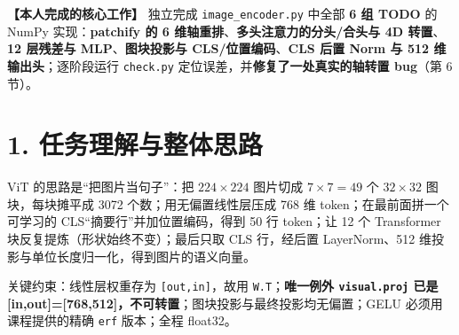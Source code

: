 \documentclass[11pt,a4paper]{article}
\newcommand{\hl}[1]{\textcolor{red!85!black}{\textbf{#1}}}
\newcommand{\code}[1]{\texttt{\small #1}}
\begin{document}
\vspace{2pt}
\noindent\colorbox{red!6}{\parbox{\dimexpr\linewidth-2\fboxsep\relax}{
\textcolor{red!85!black}{\textbf{【本人完成的核心工作】}} 独立完成 \code{image_encoder.py} 中全部 \hl{6 组 TODO} 的 NumPy 实现：\hl{patchify 的 6 维轴重排}、\hl{多头注意力的分头/合头与 4D 转置}、\hl{12 层残差与 MLP}、\hl{图块投影与 CLS/位置编码}、\hl{CLS 后置 Norm 与 512 维输出头}；逐阶段运行 \code{check.py} 定位误差，并\hl{修复了一处真实的轴转置 bug}（第 6 节）。}}

\section*{1. 任务理解与整体思路}
ViT 的思路是``把图片当句子''：把 $224\times224$ 图片切成 $7\times7=49$ 个 $32\times32$ 图块，每块摊平成 3072 个数；用无偏置线性层压成 768 维 token；在最前面拼一个可学习的 CLS``摘要行''并加位置编码，得到 50 行 token；让 12 个 Transformer 块反复提炼（形状始终不变）；最后只取 CLS 行，经后置 LayerNorm、512 维投影与单位长度归一化，得到图片的语义向量。

关键约束：线性层权重存为 \code{[out,in]}，故用 \code{W.T}；\hl{唯一例外 \code{visual.proj} 已是 [in,out]=[768,512]，不可转置}；图块投影与最终投影均无偏置；GELU 必须用课程提供的精确 \code{erf} 版本；全程 float32。
\end{document}
